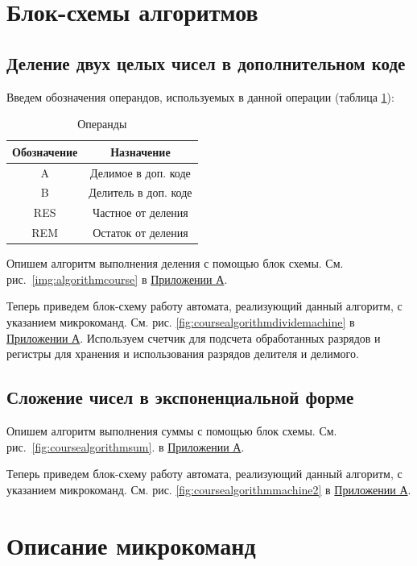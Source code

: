 \documentclass[a4paper,14pt]{extarticle}
\begin{document}
\section{Блок-схемы алгоритмов}
\subsection{Деление двух целых чисел в дополнительном коде}
Введем обозначения операндов, используемых в данной операции (таблица \ref{tab:vars}):
\begin{table}[h!]
	\small
	\centering
	\begin{tabular}{|c|c|}
		\hline
		\multicolumn{1}{|c|}{\textbf{Обозначение}} & \multicolumn{1}{c|}{\textbf{Назначение}} \\ \hline
		A & Делимое в доп. коде \\ \hline
		B & Делитель в доп. коде \\ \hline
		RES & Частное от деления \\ \hline
		REM & Остаток от деления \\ \hline
	\end{tabular}
	\caption{Операнды}
	\label{tab:vars}

\end{table} 

Опишем алгоритм выполнения деления  с помощью блок схемы.  См. рис.~\ref{img:algorithmcourse} в \hyperref[tam]{Приложении А}.


Теперь приведем блок-схему работу автомата, реализующий данный алгоритм, с указанием микрокоманд. См. рис. \ref{fig:coursealgorithmdividemachine} в \hyperref[tam]{Приложении А}. Используем счетчик для подсчета обработанных разрядов и регистры для хранения и использования разрядов делителя и делимого.


\subsection{Сложение чисел в экспоненциальной форме}
Опишем алгоритм выполнения суммы  с помощью блок схемы. См. рис.~\ref{fig:coursealgorithmsum}. в \hyperref[tam]{Приложении А}.

Теперь приведем блок-схему работу автомата, реализующий данный алгоритм, с указанием микрокоманд. См. рис. \ref{fig:coursealgorithmmachine2} в \hyperref[tam]{Приложении А}.

\section{Описание микрокоманд}
\end{document}
